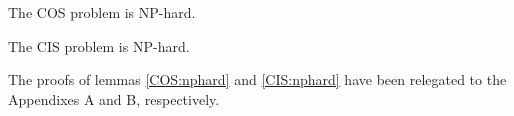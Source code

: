 \begin{comment}
An non-interruptible flow, should be forwarded within a single active period. In an OCS network with UDP, the sender has no idea about the change of lightpath and continues it's transmission, which is useless and results in the transmission failure. To avoid this type of failure, the assumption that the flow is non-interruptible is necessary.



In order to minimize the CCT, for each flow $f_{i,j}^k\in f_{i,j},f_{i,j}\in C$, we need to choose a period $[t_p^{start},t_p^{end}]\in T_{i,j}$ and determine the start time $t_{f_{i,j}^k}^{start}$ for $f_{i,j}$ that satisfies:
\begin{equation}\label{formu_2}
\begin{aligned}
 t_{f_{i,j}^k}^{start}+\frac{d_{i,j}^k}{B}&\leq t_p^{end}\\
 t_{f_{i,j}^k}^{start}&\geq t_p^{start}\\
 \end{aligned}
 \end{equation}

The above inequalities mean that the flows should be forwarded and the transmission is finished in the active period. Once a flow transmission is finished, the active period needs to be updated. Our objective is:
 \begin{equation}\label{objective_2}
 \begin{aligned}
 \min \ \ & t  \\
 t_{f_{i,j}^k}^{start}+\frac{d_{i,j}^k}{B}&\leq t, \qquad\forall f_{i,j}^k\\
 \end{aligned}
 \end{equation}
\end{comment}

\begin{theorem}\label{COS:nphard}
The COS problem is NP-hard.
\end{theorem}

\begin{theorem}\label{CIS:nphard}
The CIS problem is NP-hard.
\end{theorem}

The proofs of lemmas \ref{COS:nphard} and \ref{CIS:nphard} have been relegated to the
Appendixes A and B, respectively.
